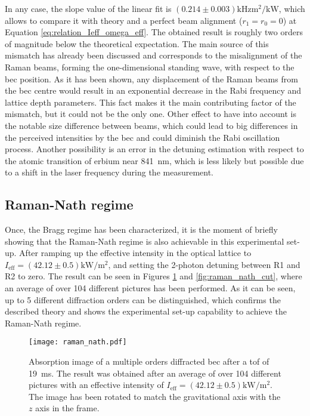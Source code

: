 In any case, the slope value of the linear fit is $(0.214\pm0.003)\si{\kilo\hertz\meter\squared\per\kilo\watt}$, which allows to compare it with theory and a perfect beam alignment ($r_1 = r_0 = 0$) at Equation \eqref{eq:relation_Ieff_omega_eff}. The obtained result is roughly two orders of magnitude below the theoretical expectation. The main source of this mismatch has already been discussed and corresponds to the misalignment of the Raman beams, forming the one-dimensional standing wave, with respect to the \ac{bec} position. As it has been shown, any displacement of the Raman beams from the \ac{bec} centre would result in an exponential decrease in the Rabi frequency and lattice depth parameters. This fact makes it the main contributing factor of the mismatch, but it could not be the only one. Other effect to have into account is the notable size difference between beams, which could lead to big differences in the perceived intensities by the \ac{bec} and could diminish the Rabi oscillation process. Another possibility is an error in the detuning estimation with respect to the atomic transition of erbium near \SI{841}{\nano\meter}, which is less likely but possible due to a shift in the laser frequency during the measurement.

\pagebreak

\subsection{Raman-Nath regime}

Once, the Bragg regime has been characterized, it is the moment of briefly showing that the Raman-Nath regime is also achievable in this experimental set-up. After ramping up the effective intensity in the optical lattice to $I_\text{eff} = (42.12 \pm 0.5)\si{\kilo\watt\per\meter\squared}$, and setting the 2-photon detuning between R1 and R2 to zero. The result can be seen in Figures \ref{fig:raman_nath} and \ref{fig:raman_nath_cut}, where an average of over 104 different pictures has been performed. As it can be seen, up to 5 different diffraction orders can be distinguished, which confirms the described theory and shows the experimental set-up capability to achieve the Raman-Nath regime.

\begin{figure}[!htbp]\centering
	\texttt{[image: raman\_nath.pdf]}
	\caption[Absorption image of a multiple orders diffracted \ac{bec} after a \ac{tof} of \SI{19}{\milli\second}]{Absorption image of a multiple orders diffracted \ac{bec} after a \ac{tof} of \SI{19}{\milli\second}. The result was obtained after an average of over 104 different pictures with an effective intensity of $I_\text{eff} = (42.12 \pm 0.5)\si{\kilo\watt\per\meter\squared}$. The image has been rotated to match the gravitational axis with the $z$ axis in the frame.}\label{fig:raman_nath_cut}\label{fig:raman_nath}
\end{figure}

